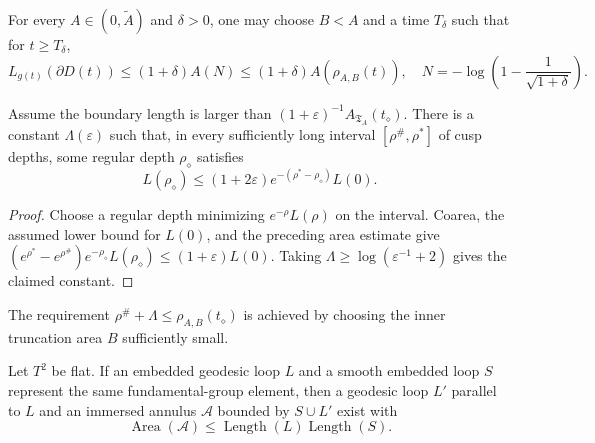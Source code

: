 \begin{corollary}
\label{cor:chow-iv-area-almost-bounds-length}
For every \(A\in(0,\widetilde A)\) and \(\delta>0\), one may choose \(B<A\)
and a time \(T_\delta\) such that for \(t\ge T_\delta\),
\[
 L_{g(t)}(\partial D(t))\le(1+\delta)A(N)
 \le(1+\delta)A(\rho_{A,B}(t)),
 \quad N=-\log\left(1-\frac1{\sqrt{1+\delta}}\right).
\]
\end{corollary}

\begin{lemma}
\label{lem:chow-iv-short-loop-deep-cusp}
Assume the boundary length is larger than
\((1+\varepsilon)^{-1}A_{\mathfrak T_A}(t_\diamond)\).  There is a constant
\(\Lambda(\varepsilon)\) such that, in every sufficiently long interval
\([\rho^\#,\rho^*]\) of cusp depths, some regular depth \(\rho_\diamond\) satisfies
\[
 L(\rho_\diamond)\le(1+2\varepsilon)
 e^{-(\rho^*-\rho_\diamond)}L(0).
\]
\end{lemma}

\begin{proof}
\sketch
Choose a regular depth minimizing \(e^{-\rho}L(\rho)\) on the interval.  Coarea,
the assumed lower bound for \(L(0)\), and the preceding area estimate give
\((e^{\rho^*}-e^{\rho^\#})e^{-\rho_\diamond}L(\rho_\diamond)
\le(1+\varepsilon)L(0)\).  Taking
\(\Lambda\ge\log(\varepsilon^{-1}+2)\) gives the claimed constant.
\end{proof}

\begin{remark}
\label{rem:chow-iv-short-loop-depth-requirement}
The requirement \(\rho^\#+\Lambda\le\rho_{A,B}(t_\diamond)\) is achieved by
choosing the inner truncation area \(B\) sufficiently small.
\end{remark}

\begin{lemma}
\label{lem:chow-iv-flat-torus-annulus-area}
Let \(T^2\) be flat.  If an embedded geodesic loop \(L\) and a smooth embedded
loop \(S\) represent the same fundamental-group element, then a geodesic loop
\(L'\) parallel to \(L\) and an immersed annulus \(\mathcal A\) bounded by
\(S\cup L'\) exist with
\[
 \operatorname{Area}(\mathcal A)
 \le\operatorname{Length}(L)\operatorname{Length}(S).
\]
\end{lemma}

